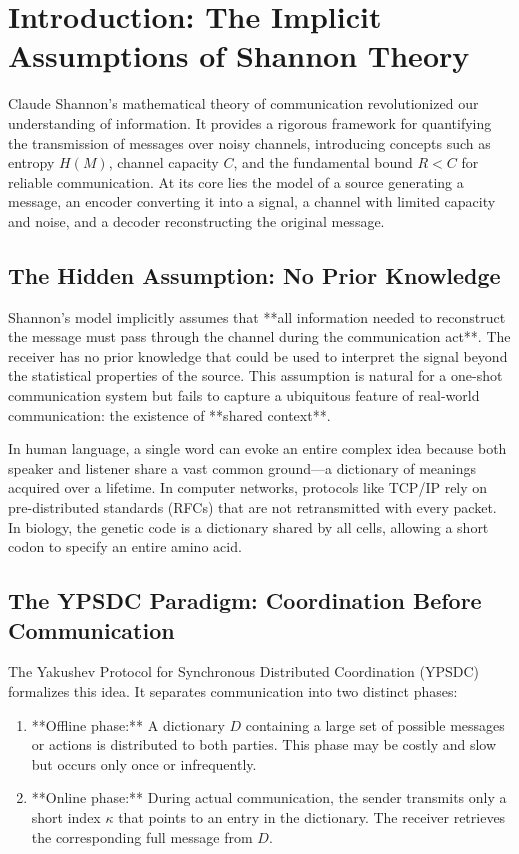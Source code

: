 \documentclass[12pt,a4paper]{article}
\theoremstyle{remark}
\begin{document}
	\section{Introduction: The Implicit Assumptions of Shannon Theory}
	\label{sec:intro}
	
	Claude Shannon's mathematical theory of communication \cite{Shannon1948} revolutionized our understanding of information. It provides a rigorous framework for quantifying the transmission of messages over noisy channels, introducing concepts such as entropy $H(M)$, channel capacity $C$, and the fundamental bound $R < C$ for reliable communication. At its core lies the model of a source generating a message, an encoder converting it into a signal, a channel with limited capacity and noise, and a decoder reconstructing the original message.
	
	\subsection{The Hidden Assumption: No Prior Knowledge}
	
	Shannon's model implicitly assumes that **all information needed to reconstruct the message must pass through the channel during the communication act**. The receiver has no prior knowledge that could be used to interpret the signal beyond the statistical properties of the source. This assumption is natural for a one-shot communication system but fails to capture a ubiquitous feature of real-world communication: the existence of **shared context**.
	
	In human language, a single word can evoke an entire complex idea because both speaker and listener share a vast common ground—a dictionary of meanings acquired over a lifetime. In computer networks, protocols like TCP/IP rely on pre-distributed standards (RFCs) that are not retransmitted with every packet. In biology, the genetic code is a dictionary shared by all cells, allowing a short codon to specify an entire amino acid.
	
	\subsection{The YPSDC Paradigm: Coordination Before Communication}
	
	The Yakushev Protocol for Synchronous Distributed Coordination (YPSDC) \cite{Yakushev2026a, AppendixB} formalizes this idea. It separates communication into two distinct phases:
	\begin{enumerate}
		\item **Offline phase:** A dictionary $D$ containing a large set of possible messages or actions is distributed to both parties. This phase may be costly and slow but occurs only once or infrequently.
		\item **Online phase:** During actual communication, the sender transmits only a short index $\kappa$ that points to an entry in the dictionary. The receiver retrieves the corresponding full message from $D$.
	\end{enumerate}
	
\end{document}

